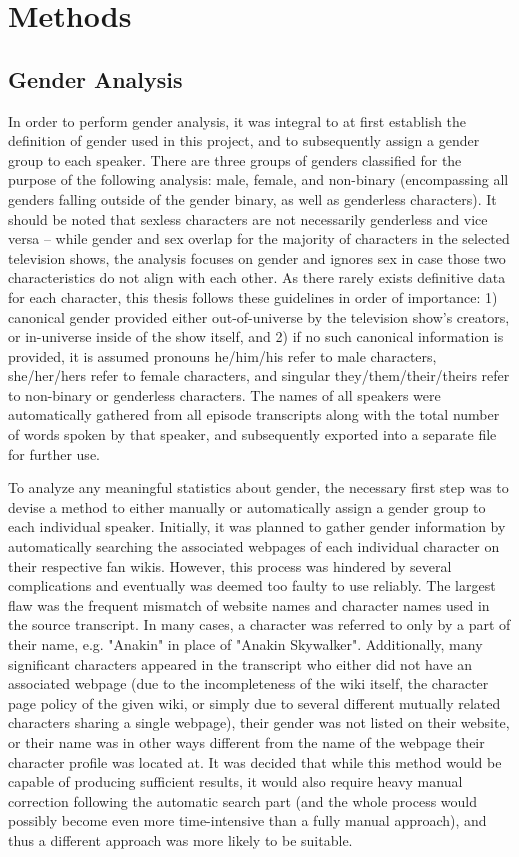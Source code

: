 \documentclass[a4paper, 11pt]{article}
\begin{document}
\section{Methods}

\subsection{Gender Analysis} \label{met:genan}
In order to perform gender analysis, it was integral to at first establish the definition of gender used in this project, and to subsequently assign a gender group to each speaker. There are three groups of genders classified for the purpose of the following analysis: male, female, and non-binary (encompassing all genders falling outside of the gender binary, as well as genderless characters). It should be noted that sexless characters are not necessarily genderless and vice versa -- while gender and sex overlap for the majority of characters in the selected television shows, the analysis focuses on gender and ignores sex in case those two characteristics do not align with each other. As there rarely exists definitive data for each character, this thesis follows these guidelines in order of importance: 1) canonical gender provided either out-of-universe by the television show's creators, or in-universe inside of the show itself, and 2) if no such canonical information is provided, it is assumed pronouns he/him/his refer to male characters, she/her/hers refer to female characters, and singular they/them/their/theirs refer to non-binary or genderless characters. The names of all speakers were automatically gathered from all episode transcripts along with the total number of words spoken by that speaker, and subsequently exported into a separate file for further use.

To analyze any meaningful statistics about gender, the necessary first step was to devise a method to either manually or automatically assign a gender group to each individual speaker. Initially, it was planned to gather gender information by automatically searching the associated webpages of each individual character on their respective fan wikis. However, this process was hindered by several complications and eventually was deemed too faulty to use reliably. The largest flaw was the frequent mismatch of website names and character names used in the source transcript. In many cases, a character was referred to only by a part of their name, e.g. "Anakin" in place of "Anakin Skywalker". Additionally, many significant characters appeared in the transcript who either did not have an associated webpage (due to the incompleteness of the wiki itself, the character page policy of the given wiki, or simply due to several different mutually related characters sharing a single webpage), their gender was not listed on their website, or their name was in other ways different from the name of the webpage their character profile was located at. It was decided that while this method would be capable of producing sufficient results, it would also require heavy manual correction following the automatic search part (and the whole process would possibly become even more time-intensive than a fully manual approach), and thus a different approach was more likely to be suitable.
\end{document}
